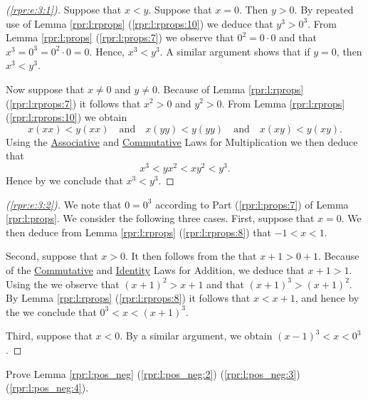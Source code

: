 \begin{proof}[(\ref{rpr:e:3:1})]
	Suppose that $x < y$. Suppose that $x = 0$. Then $y > 0$. By repeated use of Lemma \ref{rpr:l:rprops} (\ref{rpr:l:rprops:10}) we deduce that $y^3 > 0^3$. From Lemma \ref{rpr:l:props} (\ref{rpr:l:props:7}) we observe that $0^2 = 0 \cdot 0$ and that $x^3 = 0^3 = 0^2 \cdot 0 = 0$. Hence, $x^3 < y^3$. A similar argument shows that if $y = 0$, then $x^3 < y^3$.

	Now suppose that $x \neq 0$ and $y \neq 0$. Because of Lemma \ref{rpr:l:rprops} (\ref{rpr:l:rprops:7}) it follows that $x^2 > 0$ and $y^2 > 0$. From Lemma \ref{rpr:l:rprops} (\ref{rpr:l:rprops:10}) we obtain
	$$
		x (x x) < y (x x) \quad \text{and} \quad x (y y) < y (y y) \quad \text{and} \quad x (x y) < y (x y).
	$$
	Using the \hyperref[rax:d:props:associative_mult]{Associative} and \hyperref[rax:d:props:commutative_mult]{Commutative} Laws for Multiplication we then deduce that
	$$
		x^3 < y x^2 < x y^2 < y^3.
	$$
	Hence by  we conclude that $x^3 < y^3$.
\end{proof}

\begin{proof}[(\ref{rpr:e:3:2})]
	We note that $0 = 0^3$ according to Part (\ref{rpr:l:props:7}) of Lemma \ref{rpr:l:props}. We consider the following three cases. First, suppose that $x = 0$. We then deduce from Lemma \ref{rpr:l:rprops} (\ref{rpr:l:rprops:8}) that $-1 < x < 1$.

	Second, suppose that $x > 0$. It then follows from the  that $x + 1 > 0 + 1$. Because of the \hyperref[rax:d:props:commutative_add]{Commutative} and \hyperref[rax:d:props:identity_add]{Identity} Laws for Addition, we deduce that $x + 1 > 1$. Using the  we observe that $(x + 1)^2 > x + 1$ and that $(x + 1)^3 > (x + 1)^2$. By Lemma \ref{rpr:l:rprops} (\ref{rpr:l:rprops:8}) it follows that $x < x + 1$, and hence by the  we conclude that $0^3 < x < (x + 1)^3$.

	Third, suppose that $x < 0$. By a similar argument, we obtain ${(x - 1)^3 < x < 0^3}$.
\end{proof}


\Newpage
\begin{exercise} %
	Prove Lemma \ref{rpr:l:pos_neg} (\ref{rpr:l:pos_neg:2}) (\ref{rpr:l:pos_neg:3}) (\ref{rpr:l:pos_neg:4}).
\end{exercise}

